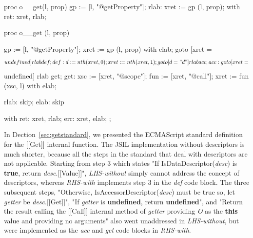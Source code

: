 \documentclass[a4paper,11pt,twoside]{report}
\begin{document}
\begin{minipage}{.45\textwidth}
\begin{lstjsil}
proc o__get(l, prop) {
          gp := [l, "@getProperty"];
    rlab: xret := gp (l, prop);
}
with
{
    ret: xret, rlab;
}
\end{lstjsil}
\end{minipage}%
\hfill
\begin{minipage}{.50\textwidth}
\begin{lstjsil}
proc o__get (l, prop) {
				gp := [l, "@getProperty"];
				xret := gp (l, prop) with elab;	
				goto [xret = $$undefined] rlab def;
			
	def:	d := nth (xret, 0);
				xret := nth (xret, 1);
				goto [d = "d"] rlab acc;
			
	acc:	goto [xret = $$undefined] rlab get;
	get:	xsc := [xret, "@scope"];
				fun := [xret, "@call"];
				xret := fun (xsc, l) with elab;
			
	rlab:	skip;
	elab:	skip
}
with
{
    ret: xret, rlab;
    err: xret, elab;
};
\end{lstjsil}
\end{minipage}

In Dection~\ref{sec:getstandard}, we presented the ECMAScript standard definition for the [[Get]] internal function. The JSIL implementation without descriptors is much shorter, because all the steps in the standard that deal with descriptors are not applicable. Starting from step 3 which states "If IsDataDescriptor(\textit{desc}) is \textbf{true}, return \textit{desc}.[[Value]]", \textit{LHS-without} simply cannot address the concept of descriptors, whereas \textit{RHS-with} implements step 3 in the \textit{def} code block. The three subsequent steps, "Otherwise, IsAccessorDescriptor(\textit{desc}) must be true so, let \textit{getter} be \textit{desc}.[[Get]]", "If \textit{getter} is \textbf{undefined}, return \textbf{undefined}", and "Return the result calling the [[Call]] internal method of \textit{getter} providing \textit{O} as the \textbf{this} value and providing no arguments" also went unaddressed in \textit{LHS-without}, but were implemented as the \textit{acc} and \textit{get} code blocks in \textit{RHS-with}.
\end{document}
